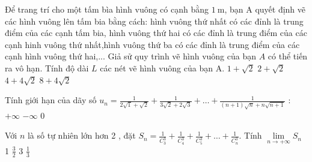 \begin{ex}%
	Để trang trí cho một tấm bìa hình vuông có cạnh bằng $1 \mathrm{~m}$, bạn $\mathrm{A}$ quyết định vẽ các hình vuông lên tấm bia bằng cách: hình vuông thứ nhất có các đỉnh là trung điểm của các cạnh tấm bia, hình vuông thứ hai có các đỉnh là trung điểm của các cạnh hinh vuông thứ nhất,hình vuông thứ ba có các đỉnh là trung điểm của các cạnh hình vuông thứ hai,... Giả sử quy trình vẽ hình vuông của bạn $A$ có thể tiến ra vô hạn. Tính độ dài $L$ các nét vẽ hình vuông của bạn $\mathrm{A}$.
\choice
{$1+\sqrt{2}$}
{$2+\sqrt{2}$}
{\True $4+4 \sqrt{2}$}
{$8+4 \sqrt{2}$}
\end{ex}
\begin{ex}%
	Tính giới hạn của dãy số $u_n=\frac{1}{2 \sqrt{1}+\sqrt{2}}+\frac{1}{3 \sqrt{2}+2 \sqrt{3}}+\ldots+\frac{1}{(n+1) \sqrt{n}+n \sqrt{n+1}}$ :
\choice
{$+\infty$}
{$-\infty$}
{0 }
{  }
\end{ex}
\begin{ex}%
	Với $n$ là số tự nhiên lớn hơn 2 , đặt $S_n=\frac{1}{C_3^3}+\frac{1}{C_4^3}+\frac{1}{C_5^3}+\ldots+\frac{1}{C_n^3}$. Tính $\lim \limits_{n \to +\infty}S_n$
\choice
{1} 
{$\frac{3}{2}$}
{3}
{$\frac{1}{3}$}
\end{ex}
